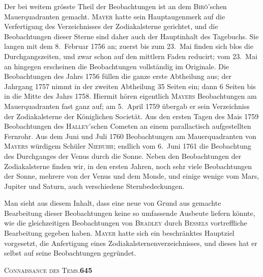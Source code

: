 \documentclass[12pt,a4paper]{article}
\begin{document}
Der bei weitem gr\"osste Theil der Beobachtungen ist an dem \textsc{Bir\^o}'schen Mauerquadranten gemacht. \textsc{Mayer} hatte sein Hauptaugenmerk auf die Verfertigung des Verzeichnisses der Zodiakalsterne gerichtet, und die Beobachtungen dieser Sterne sind daher auch der Hauptinhalt des Tagebuchs. Sie langen mit dem 8.\ Februar 1756 an; zuerst bis zum 23.\ Mai finden sich blos die Durchgangszeiten, und zwar schon auf den mittlern Faden reducirt; vom 23.\ Mai an hingegen erscheinen die Beobachtungen vollst\"andig im Originale. Die Beobachtungen des Jahrs 1756 f\"ullen die ganze erste Abtheilung aus; der Jahrgang 1757 nimmt in der zweiten Abtheilung 35 Seiten ein; dann 6 Seiten bis in die Mitte des Jahrs 1758. Hiermit h\"oren eigentlich \textsc{Mayers} Beobachtungen am Mauerquadranten fast ganz auf; am 5.\ April 1759 \"ubergab er sein Verzeichniss der Zodiakalsterne der K\"oniglichen Societ\"at. Aus den ersten Tagen des Mais 1759 Beobachtungen des \textsc{Halley}'schen Cometen an einem parallactisch aufgestellten Fernrohr. Aus dem Juni und Juli 1760 Beobachtungen am Mauerquadranten von \textsc{Mayers} w\"urdigem Sch\"uler \textsc{Niebuhr}; endlich vom 6.\ Juni 1761 die Beobachtung des Durchganges der Venus durch die Sonne. Neben den Beobachtungen der Zodiakalsterne finden wir, in den ersten Jahren, noch sehr viele Beobachtungen der Sonne, mehrere von der Venus und dem Monde, und einige wenige vom Mars, Jupiter und Saturn, auch verschiedene Sternbedeckungen.

Man sieht aus diesem Inhalt, dass eine neue von Grund aus gemachte Bearbeitung dieser Beobachtungen keine so umfassende Ausbeute liefern k\"onnte, wie die gleichzeitigen Beobachtungen von \textsc{Bradley} durch \textsc{Bessels} vortreffliche Bearbeitung gegeben haben. \textsc{Mayer} hatte sich ein beschr\"anktes Hauptziel vorgesetzt, die Anfertigung eines Zodiakalsternenverzeichnisses, und dieses hat er selbst auf seine Beobachtungen gegr\"undet.

\begin{center}
\small\textsc{Connaissance des Tems.}\quad\textbf{645}
\end{center}
\end{document}
